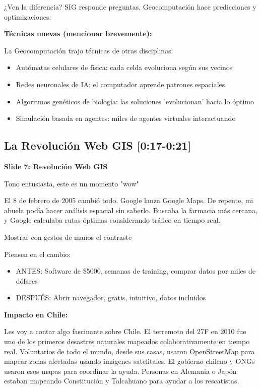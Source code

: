 \documentclass[11pt,a4paper]{article}
\newcommand{\tiempo}[1]{\textcolor{timecolor}{\faIcon{clock} \textbf{[#1]}}}
\newcommand{\decir}[1]{\begin{tcolorbox}[colback=blue!5,colframe=usachblue,title={\faIcon{microphone} DECIR}]#1\end{tcolorbox}}
\newcommand{\hacer}[1]{\begin{tcolorbox}[colback=green!5,colframe=green!50!black,title={\faIcon{hand-point-right} HACER}]#1\end{tcolorbox}}
\begin{document}
\decir{¿Ven la diferencia? SIG responde preguntas. Geocomputación hace predicciones y optimizaciones.}

\textbf{Técnicas nuevas (mencionar brevemente):}

\decir{La Geocomputación trajo técnicas de otras disciplinas:
\begin{itemize}
    \item Autómatas celulares de física: cada celda evoluciona según sus vecinos
    \item Redes neuronales de IA: el computador aprende patrones espaciales
    \item Algoritmos genéticos de biología: las soluciones 'evolucionan' hacia lo óptimo
    \item Simulación basada en agentes: miles de agentes virtuales interactuando
\end{itemize}
}

\subsection{La Revolución Web GIS \tiempo{0:17-0:21}}

\textbf{Slide 7: Revolución Web GIS}

\hacer{Tono entusiasta, este es un momento "wow"}

\decir{El 8 de febrero de 2005 cambió todo. Google lanza Google Maps. De repente, mi abuela podía hacer análisis espacial sin saberlo. Buscaba la farmacia más cercana, y Google calculaba rutas óptimas considerando tráfico en tiempo real.}

\hacer{Mostrar con gestos de manos el contraste}

\decir{Piensen en el cambio:
\begin{itemize}
    \item ANTES: Software de \$5000, semanas de training, comprar datos por miles de dólares
    \item DESPUÉS: Abrir navegador, gratis, intuitivo, datos incluidos
\end{itemize}
}

\textbf{Impacto en Chile:}

\decir{Les voy a contar algo fascinante sobre Chile. El terremoto del 27F en 2010 fue uno de los primeros desastres naturales mapeados colaborativamente en tiempo real. Voluntarios de todo el mundo, desde sus casas, usaron OpenStreetMap para mapear zonas afectadas usando imágenes satelitales. El gobierno chileno y ONGs usaron esos mapas para coordinar la ayuda. Personas en Alemania o Japón estaban mapeando Constitución y Talcahuano para ayudar a los rescatistas.}
\end{document}
